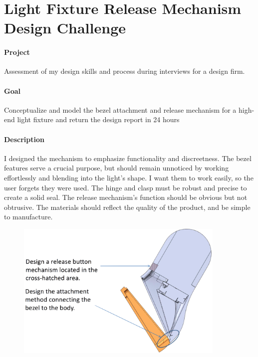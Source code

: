 \documentclass[12pt, landscape]{article}
\begin{document}
	\section{Light Fixture Release Mechanism Design Challenge}
		\paragraph{Project} Assessment of my design skills and process during interviews for a design firm.
		\paragraph{Goal} Conceptualize and model the bezel attachment and release mechanism for a high-end light fixture and return the design report in 24 hours
		\paragraph{Description} I designed the mechanism to emphasize functionality and discreetness. The bezel features serve a crucial purpose, but should remain unnoticed by working effortlessly and blending into the light's shape. I want them to work easily, so the user forgets they were used. The hinge and clasp must be robust and precise to create a solid seal. The release mechanism's function should be obvious but not obtrusive.  The materials should reflect the quality of the product, and be simple to manufacture.  %

	\begin{figure}[H]
		\centering
		\includegraphics[height=2.6in]{media/inch-task}
		\label{inch-task}
	\end{figure}

	\clearpage
\end{document}
